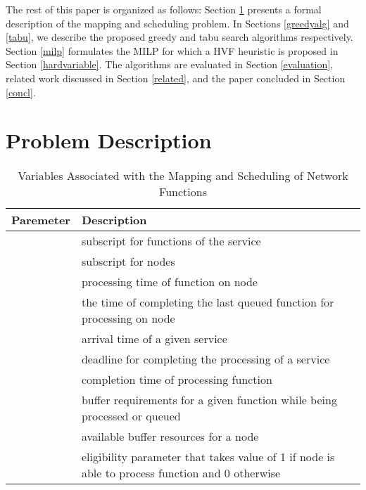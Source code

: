 \documentclass[conference]{IEEEtran}
\begin{document}
\indent The rest of this paper is organized as follows: Section \ref{problem} presents a formal description of the mapping and scheduling problem. In Sections \ref{greedyalg} and \ref{tabu}, we describe the proposed greedy and tabu search algorithms respectively. Section \ref{milp} formulates the \ac{MILP} for which a HVF heuristic is proposed in Section \ref{hardvariable}. The algorithms are evaluated in Section \ref{evaluation}, related work discussed in Section \ref{related}, and the paper concluded in Section \ref{concl}.
\section{Problem Description}\label{problem}
\begin{table*}[t]
\begin{minipage}{1\textwidth}
\caption{Variables Associated with the Mapping and Scheduling of Network Functions}
\renewcommand{\arraystretch}{1.3}
\small
\centering
{}
\begin{tabular}{ c l}\hline
\bfseries Paremeter & \bfseries Description\\
\hline\hline
 & subscript for functions of the service\\
 & subscript for nodes\\
 & processing time of function  on node \\
 & the time of completing the last queued function for processing on node \\
 & arrival time of a given service\\
 & deadline for completing the processing of a service\\
 & completion time of processing function \\
 & buffer requirements for a given function while being processed or queued\\
 & available buffer resources for a node \\
 & eligibility parameter that takes value of 1 if node  is able to process function  and 0 otherwise\\
\hline
\end{tabular}
\label{variables}
\end{minipage}
\end{table*}
\end{document}
